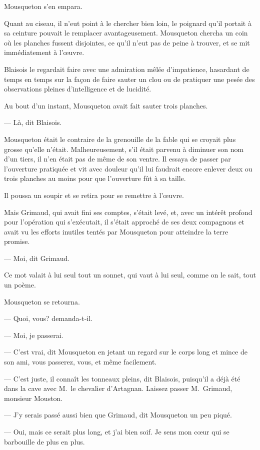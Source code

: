 Mousqueton s'en empara.

Quant au ciseau, il n'eut point à le chercher bien loin, le poignard qu'il portait à sa ceinture pouvait le remplacer avantageusement. Mousqueton chercha un coin où les planches fussent disjointes, ce qu'il n'eut pas de peine à trouver, et se mit immédiatement à l'œuvre.

Blaisois le regardait faire avec une admiration mêlée d'impatience, hasardant de temps en temps sur la façon de faire sauter un clou ou de pratiquer une pesée des observations pleines d'intelligence et de lucidité.

Au bout d'un instant, Mousqueton avait fait sauter trois planches.

— Là, dit Blaisois.

Mousqueton était le contraire de la grenouille de la fable qui se croyait plus grosse qu'elle n'était. Malheureusement, s'il était parvenu à diminuer son nom d'un tiers, il n'en était pas de même de son ventre. Il essaya de passer par l'ouverture pratiquée et vit avec douleur qu'il lui faudrait encore enlever deux ou trois planches au moins pour que l'ouverture fût à sa taille.

Il poussa un soupir et se retira pour se remettre à l'œuvre.

Mais Grimaud, qui avait fini ses comptes, s'était levé, et, avec un intérêt profond pour l'opération qui s'exécutait, il s'était approché de ses deux compagnons et avait vu les efforts inutiles tentés par Mousqueton pour atteindre la terre promise.

— Moi, dit Grimaud.

Ce mot valait à lui seul tout un sonnet, qui vaut à lui seul, comme on le sait, tout un poème.

Mousqueton se retourna.

— Quoi, vous? demanda-t-il.

— Moi, je passerai.

— C'est vrai, dit Mousqueton en jetant un regard sur le corps long et mince de son ami, vous passerez, vous, et même facilement.

— C'est juste, il connaît les tonneaux pleins, dit Blaisois, puisqu'il a déjà été dans la cave avec M.~le chevalier d'Artagnan. Laissez passer M.~Grimaud, monsieur Mouston.

— J'y serais passé aussi bien que Grimaud, dit Mousqueton un peu piqué.

— Oui, mais ce serait plus long, et j'ai bien soif. Je sens mon cœur qui se barbouille de plus en plus.

